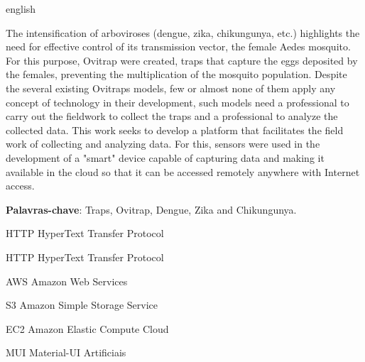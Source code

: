 \documentclass[
	12pt,				%
	openright,			%
	oneside,			%
	a4paper,			%
	chapter=TITLE,		%
	english,			%
	brazil				%
	]{abntex2}
\begin{document}
\begin{resumo}[Abstract]
\begin{otherlanguage*}{english}

The intensification of arboviroses (dengue, zika, chikungunya, etc.) highlights the need for effective control of its transmission vector, 
the female Aedes mosquito. For this purpose, Ovitrap were created, traps that capture the eggs deposited by the females, preventing the 
multiplication of the mosquito population. Despite the several existing Ovitraps models, few or almost none of them apply any concept of 
technology in their development, such models need a professional to carry out the fieldwork to collect the traps and a professional to 
analyze the collected data. This work seeks to develop a platform that facilitates the field work of collecting and analyzing data. For 
this, sensors were used in the development of a "smart" device capable of capturing data and making it available in the cloud so that 
it can be accessed remotely anywhere with Internet access.

\textbf{Palavras-chave}: Traps, Ovitrap, Dengue, Zika and Chikungunya.

\end{otherlanguage*}
\end{resumo}


\listoffigures*
\cleardoublepage

\listoftables*
\cleardoublepage

\begin{siglas}
  \item[HTTP] HyperText Transfer Protocol
  \item[HTTP] HyperText Transfer Protocol
  \item[AWS] Amazon Web Services
  \item[S3] Amazon Simple Storage Service
  \item[EC2] Amazon Elastic Compute Cloud
  \item[MUI] Material-UI 
Artificiais 
\end{siglas}

\tableofcontents*
\cleardoublepage
\end{document}
